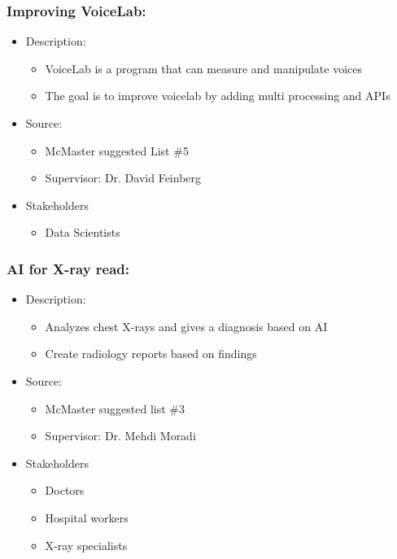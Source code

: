 \documentclass{article}
\begin{document}
\subsubsection*{Improving VoiceLab:}
\label{subsec:voicelab}
\begin{itemize}
    \item Description:
    \begin{itemize}
        \item VoiceLab is a program that can measure and manipulate voices 
        \item The goal is to improve voicelab by adding multi processing and APIs
    \end{itemize}
    \item Source:
    \begin{itemize}
        \item McMaster suggested List \#5
        \item Supervisor: Dr. David Feinberg
    \end{itemize}
    \item Stakeholders
    \begin{itemize}
        \item Data Scientists
    \end{itemize}
\end{itemize}

\subsubsection*{AI for X-ray read:}
\label{subsec:xray}
\begin{itemize}
    \item Description:
    \begin{itemize}
        \item Analyzes chest X-rays and gives a diagnosis based on AI 
        \item Create radiology reports based on findings
    \end{itemize}
    \item Source:
    \begin{itemize}
        \item McMaster suggested list \#3
        \item Supervisor: Dr. Mehdi Moradi
    \end{itemize}
    \item Stakeholders
    \begin{itemize}
        \item Doctors
        \item Hospital workers
        \item X-ray specialists 
    \end{itemize}
\end{itemize}
\end{document}
